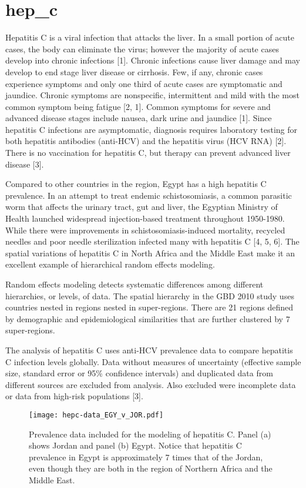 \chapter{hep_c}
\label{applications-rfx}

Hepatitis C is a viral infection that attacks the liver.  In a small portion of acute cases, the body can eliminate the virus; however the majority of acute cases develop into chronic infections [1].  Chronic infections cause liver damage and may develop to end stage liver disease or cirrhosis.  Few, if any, chronic cases experience symptoms and only one third of acute cases are symptomatic and jaundice.  Chronic symptoms are nonspecific, intermittent and mild with the most common symptom being fatigue [2, 1].  Common symptoms for severe and advanced disease stages include nausea, dark urine and jaundice [1].  Since hepatitis C infections are asymptomatic, diagnosis requires laboratory testing for both hepatitis antibodies (anti-HCV) and the hepatitis virus (HCV RNA) [2].  There is no vaccination for hepatitis C, but therapy can prevent advanced liver disease [3].

Compared to other countries in the region, Egypt has a high hepatitis C prevalence.  In an attempt to treat endemic schistosomiasis, a common parasitic worm that affects the urinary tract, gut and liver, the Egyptian Ministry of Health launched widespread injection-based treatment throughout 1950-1980.  While there were improvements in schistosomiasis-induced mortality, recycled needles and poor needle sterilization infected many with hepatitis C [4, 5, 6].  The spatial variations of hepatitis C in North Africa and the Middle East make it an excellent example of hierarchical random effects modeling.

Random effects modeling detects systematic differences among different hierarchies, or levels, of data.  The spatial hierarchy in the GBD 2010 study uses countries nested in regions nested in super-regions.  There are 21 regions defined by demographic and epidemiological similarities that are further clustered by 7 super-regions.

The analysis of hepatitis C uses anti-HCV prevalence data to compare hepatitis C infection levels globally.  Data without measures of uncertainty (effective sample size, standard error or 95\% confidence intervals) and duplicated data from different sources are excluded from analysis.  Also excluded were incomplete data or data from high-risk populations [3].

    \begin{figure}[h]
        \begin{center}
            \texttt{[image: hepc-data\_EGY\_v\_JOR.pdf]}
            \caption{Prevalence data included for the modeling of hepatitis C.  Panel (a) shows Jordan and panel (b) Egypt.  Notice that hepatitis C prevalence in Egypt is approximately 7 times that of the Jordan, even though they are both in the region of Northern Africa and the Middle East.}
            \label{fig:app-hepc data}
        \end{center}
    \end{figure}

